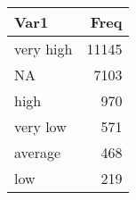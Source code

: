 
\begin{tabular}[t]{lr}
\toprule
Var1 & Freq\\
\midrule
very high & 11145\\
NA & 7103\\
high & 970\\
very low & 571\\
average & 468\\
\addlinespace
low & 219\\
\bottomrule
\end{tabular}